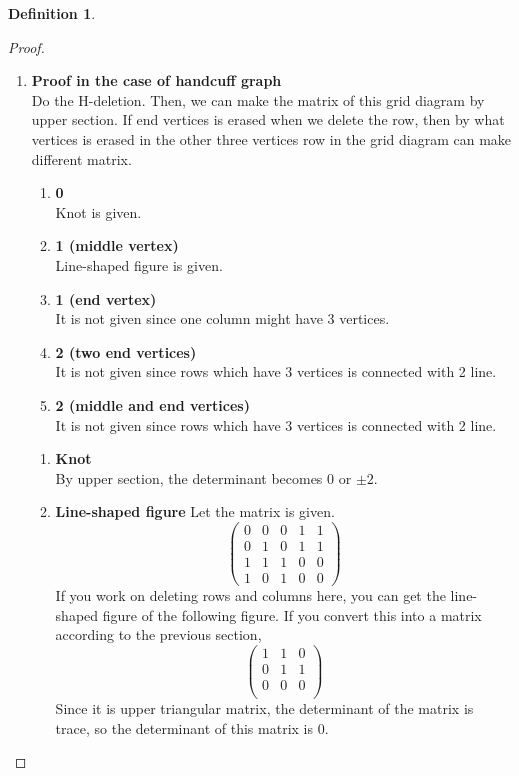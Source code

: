 \documentclass{article}
\theoremstyle{definition}
\newtheorem{defn}[thm]{Definition}
\theoremstyle{theorem}
\theoremstyle{proposition}
\theoremstyle{corollary}
\begin{document}
\begin{defn}
\begin{proof}
\begin{enumerate}
\item \textbf{Proof in the case of handcuff graph}\\
    Do the H-deletion. Then, we can make the matrix of this grid diagram by upper section. If end vertices is erased when we delete the row, then by what vertices is erased in the other three vertices row in the grid diagram can make different matrix.
    \begin{enumerate}
        \item \textbf{0}\\
        Knot is given.
        \item \textbf{1 (middle vertex)}\\
        Line-shaped figure is given.
        \item \textbf{1 (end vertex)}\\
        It is not given since one column might have 3 vertices.
        \item \textbf{2 (two end vertices)}\\
        It is not given since rows which have 3 vertices is connected with 2 line.
        \item \textbf{2 (middle and end vertices)}\\
        It is not given since rows which have 3 vertices is connected with 2 line.
    \end{enumerate}
    
    \begin{enumerate}[label={(\roman*)}]
        \item \textbf{Knot}\\
        By upper section, the determinant becomes 0 or $\pm 2$.
        \item \textbf{Line-shaped figure}
        Let the matrix is given.
        $$\begin{pmatrix}
            0 & 0 & 0 & 1 & 1\\
            0 & 1 & 0 & 1 & 1\\
            1 & 1 & 1 & 0 & 0\\
            1 & 0 & 1 & 0 & 0
        \end{pmatrix}$$
        If you work on deleting rows and columns here, you can get the line-shaped figure of the following figure. If you convert this into a matrix according to the previous section,
        $$\begin{pmatrix}
            1 & 1 & 0 \\
            0 & 1 & 1 \\
            0 & 0 & 0 \\
        \end{pmatrix}$$
        Since it is upper triangular matrix, the determinant of the matrix is trace, so the determinant of this matrix is 0.
    \end{enumerate}
\end{enumerate}
\end{proof}


\end{defn}
\end{document}
